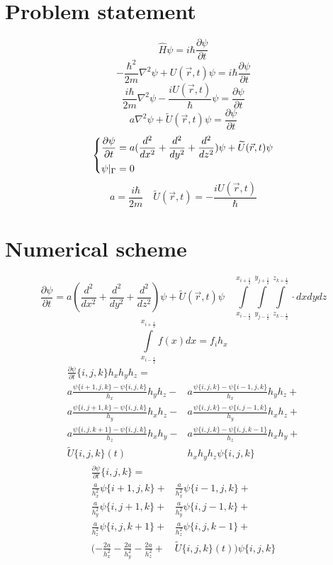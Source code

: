 \documentclass[a4paper,12pt]{article}
\begin{document}
\section{Problem statement}
\[
    \widehat{H}\psi = i \hbar \frac{\partial \psi}{\partial t}
\]
\[
    -\frac{\hbar^2}{2m} \nabla^2\psi + U(\vec{r}, t) \psi = i \hbar \frac{\partial \psi}{\partial t}
\]
\[
    \frac{i \hbar}{2m} \nabla^2\psi - \frac{i U(\vec{r}, t)}{\hbar} \psi = \frac{\partial \psi}{\partial t}
\]
\[
    a \nabla^2\psi + \widetilde{U}(\vec{r}, t)\psi = \frac{\partial \psi}{\partial t}
\]
\[
\begin{dcases}
    \frac{\partial \psi}{\partial t} = a(\frac{d^2}{dx^2} + \frac{d^2}{dy^2} + \frac{d^2}{dz^2})\psi + \widetilde{U}(\vec{r}, t)\psi\\
    \psi|_{\Gamma} = 0\\
\end{dcases}
\]
\[ a = \frac{i \hbar}{2m} \quad \widetilde{U}(\vec{r}, t) = - \frac{i U(\vec{r}, t)}{\hbar}\]
\section{Numerical scheme}
\[
\frac{\partial \psi}{\partial t} = a(\frac{d^2}{dx^2} + \frac{d^2}{dy^2} + \frac{d^2}{dz^2})\psi + \widetilde{U}(\vec{r}, t)\psi
\quad\int\limits_{x_{i-\frac{1}{2}}}^{x_{i+\frac{1}{2}}}\int\limits_{y_{j-\frac{1}{2}}}^{y_{j+\frac{1}{2}}}\int\limits_{z_{k-\frac{1}{2}}}^{z_{k+\frac{1}{2}}} \cdot dx dy dz
\]
\[
\int\limits_{x_{i-\frac{1}{2}}}^{x_{i+\frac{1}{2}}} f(x) dx = f_{i} h_{x}
\]
\[
\begin{aligned}
\frac{\partial \psi}{\partial t}\{i, j, k\}h_x h_y h_z = \\
a \frac{\psi\{i+1, j, k\} - \psi\{i, j, k\}}{h_x}h_y h_z -&
a \frac{\psi\{i, j, k\} - \psi\{i-1, j, k\}}{h_x}h_y h_z+\\
a \frac{\psi\{i, j+1, k\} - \psi\{i, j, k\}}{h_y}h_x h_z -&
a \frac{\psi\{i, j, k\} - \psi\{i, j-1, k\}}{h_y}h_x h_z+\\
a \frac{\psi\{i, j, k+1\} - \psi\{i, j, k\}}{h_z}h_x h_y -&
a \frac{\psi\{i, j, k\} - \psi\{i, j, k-1\}}{h_z}h_x h_y+\\
\widetilde{U}\{i, j, k\}(t) &h_x h_y h_z \psi\{i, j, k\}
\end{aligned}
\]
\[
\begin{aligned}
\frac{\partial \psi}{\partial t}\{i, j, k\} =& \\
\frac{a}{h_x^2}\psi\{i+1, j, k\} +& \frac{a}{h_x^2}\psi\{i-1, j, k\} + \\
\frac{a}{h_y^2}\psi\{i, j+1, k\} +& \frac{a}{h_y^2}\psi\{i, j-1, k\} + \\
\frac{a}{h_z^2}\psi\{i, j, k+1\} +& \frac{a}{h_z^2}\psi\{i, j, k-1\} + \\
(-\frac{2a}{h_x^2} - \frac{2a}{h_y^2} - \frac{2a}{h_z^2} +& \widetilde{U}\{i, j, k\}(t))\psi\{i, j, k\}
\end{aligned}
\]
\end{document}
